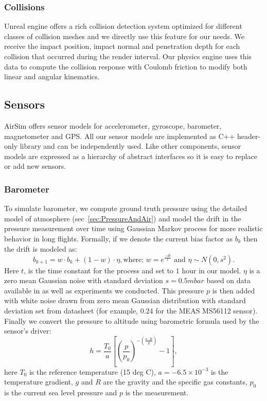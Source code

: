 \documentclass[graybox]{svmult}
\newcommand{\Name}{AirSim\xspace}
\newcommand\tododey[1]{\textcolor{red}{#1}}
\newcommand\todochris[1]{\textcolor{blue}{#1}}
\begin{document}
\subsubsection{Collisions}
Unreal engine offers a rich collision detection system optimized for different classes of collision meshes and we directly use this feature for our needs. We receive the impact position, impact normal and penetration depth for each collision that occurred during the render interval. Our physics engine uses this data to compute the collision response with Coulomb friction to modify both linear and angular kinematics.

\subsection{Sensors}
\Name offers sensor models for accelerometer, gyroscope, barometer, magnetometer and GPS. All our sensor models are implemented as C++ header-only library and can be independently used. Like other components, sensor models are expressed as a hierarchy of abstract interfaces so it is easy to replace or add new sensors.

\subsubsection{Barometer}
To simulate barometer, we compute ground truth pressure using the detailed model of atmosphere (sec~\ref{sec:PressureAndAir}) and model the drift in the pressure measurement over time using Gaussian Markov process \cite{StochBaro} for more realistic behavior in long flights. Formally, if we denote the current bias factor as $b_k$ then the drift is modeled as:
\begin{equation*}
b_{k+1} = w\cdot b_k + (1-w)\cdot\eta, \mbox{where: } w = e^{\frac{-dt}{t}} \mbox{ and } \eta\sim N(0,s^2).
\end{equation*}
Here $t$, is the time constant for the process and set to $1$ hour in our model. $\eta$ is a zero mean Gaussian noise with standard deviation $s=0.5 mbar$ based on data available in \cite{Burch2014} as well as experiments we conducted. This pressure $p$ is then added with white noise drawn from zero mean Gaussian distribution with standard deviation set from datasheet (for example, 0.24 for the MEAS MS56112 sensor). Finally we convert the pressure to altitude using barometric formula used by the sensor's driver:
\begin{equation*}
h = \frac{T_{0}}{a} \left[\left(\frac{p}{p_{0}}\right)^{-(\frac{a \cdot R}{g})} - 1 \right],
\end{equation*}
here $T_{0}$ is the reference temperature (15 deg C), $a = -6.5 \times 10^{-3}$ is the temperature gradient, $g$ and $R$ are the gravity and the specific gas constants, $p_{0}$ is the current sea level pressure and $p$ is the measurement.
\end{document}
